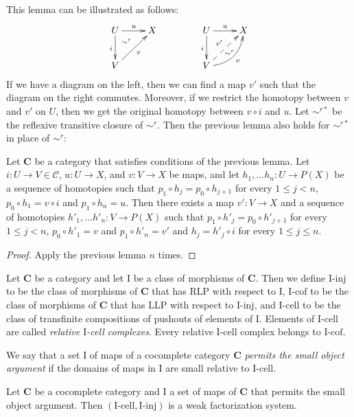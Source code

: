 \documentclass{tac}
\theoremstyle{definition}
\newcommand{\cof}{\mathcal{C}}
\newcommand{\cat}[1]{\mathbf{#1}}
\newcommand{\C}{\cat{C}}
\newcommand{\I}{\mathrm{I}}
\newcommand{\class}[2]{#1\text{-}\mathrm{#2}}
\newcommand{\Iinj}[1][\I]{\class{#1}{inj}}
\newcommand{\Icell}[1][\I]{\class{#1}{cell}}
\newcommand{\Icof}[1][\I]{\class{#1}{cof}}
\begin{document}
This lemma can be illustrated as follows:
\[ \xymatrix{ U \ar[r]^u \ar[d]_i \ar@{}[dr]|(.3){\sim^r} & X \\
              V \ar[ur]_v &
            }
\qquad \qquad
   \xymatrix{ U \ar[r]^u \ar[d]_i \ar@{}[dr]|(.62){\sim^r} & X \\
              V \ar@{-->}[ur]^{v'} \ar@/_1pc/[ur]_v &
            } \]
If we have a diagram on the left, then we can find a map $v'$ such that the diagram on the right commutes.
Moreover, if we restrict the homotopy between $v$ and $v'$ on $U$, then we get the original homotopy between $v \circ i$  and $u$.
Let $\sim^{r*}$ be the reflexive transitive closure of $\sim^r$.
Then the previous lemma also holds for $\sim^{r*}$ in place of $\sim^r$:

\begin{lem}
Let $\C$ be a category that satisfies conditions of the previous lemma.
Let $i : U \to V \in \cof$, $u : U \to X$, and $v : V \to X$ be maps, and let $h_1, \ldots h_n : U \to P(X)$ be a sequence of homotopies
such that $p_1 \circ h_j = p_0 \circ h_{j+1}$ for every $1 \leq j < n$, $p_0 \circ h_1 = v \circ i$ and $p_1 \circ h_n = u$.
Then there exists a map $v' : V \to X$ and a sequence of homotopies $h'_1, \ldots h'_n : V \to P(X)$
such that $p_1 \circ h'_j = p_0 \circ h'_{j+1}$ for every $1 \leq j < n$, $p_0 \circ h'_1 = v$ and $p_1 \circ h'_n = v'$ and $h_j = h'_j \circ i$ for every $1 \leq j \leq n$.
\end{lem}
\begin{proof}
Apply the previous lemma $n$ times.
\end{proof}

Let $\C$ be a category and let $\I$ be a class of morphisms of $\C$.
Then we define $\Iinj$ to be the class of morphisms of $\C$ that has RLP with respect to $\I$,
$\Icof$ to be the class of morphisms of $\C$ that has LLP with respect to $\Iinj$, and
$\Icell$ to be the class of transfinite compositions of pushouts of elements of $\I$.
Elements of $\Icell$ are called \emph{relative $\I$-cell complexes}.
Every relative $\I$-cell complex belongs to $\Icof$.

We say that a set $\I$ of maps of a cocomplete category $\C$ \emph{permits the small object argument}
if the domains of maps in $\I$ are small relative to $\Icell$.

\begin{prop}
Let $\C$ be a cocomplete category and $\I$ a set of maps of $\C$ that permits the small object argument.
Then $(\Icell,\Iinj)$ is a weak factorization system.
\end{prop}
\end{document}
